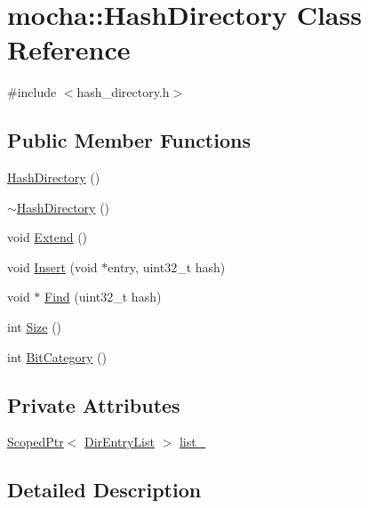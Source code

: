 \hypertarget{classmocha_1_1_hash_directory}{
\section{mocha::HashDirectory Class Reference}
\label{classmocha_1_1_hash_directory}
}


{\ttfamily \#include $<$hash\_\-directory.h$>$}

\subsection*{Public Member Functions}
\begin{DoxyCompactItemize}
\item 
\hyperlink{classmocha_1_1_hash_directory_a3ea583c29d6d123eddcbe832d9c3913f}{HashDirectory} ()
\item 
\hyperlink{classmocha_1_1_hash_directory_a27d9f5f1ca13e5ef032fed8fa3d58a11}{$\sim$HashDirectory} ()
\item 
void \hyperlink{classmocha_1_1_hash_directory_a5e16422f40e098b560727d0c889cf424}{Extend} ()
\item 
void \hyperlink{classmocha_1_1_hash_directory_a86d481df41913026309dde8fb83ff74d}{Insert} (void $\ast$entry, uint32\_\-t hash)
\item 
void $\ast$ \hyperlink{classmocha_1_1_hash_directory_a5220c62c462422718eb7f75d754b6126}{Find} (uint32\_\-t hash)
\item 
int \hyperlink{classmocha_1_1_hash_directory_a0b92cb0ee78a2d5d1ee0653b1946592b}{Size} ()
\item 
int \hyperlink{classmocha_1_1_hash_directory_a4681d2ce4178931a0834d0cb95d16785}{BitCategory} ()
\end{DoxyCompactItemize}
\subsection*{Private Attributes}
\begin{DoxyCompactItemize}
\item 
\hyperlink{classmocha_1_1_scoped_ptr}{ScopedPtr}$<$ \hyperlink{classmocha_1_1_dir_entry_list}{DirEntryList} $>$ \hyperlink{classmocha_1_1_hash_directory_ae64210a843b2cd26679a0beb226a2ed1}{list\_\-}
\end{DoxyCompactItemize}


\subsection{Detailed Description}


